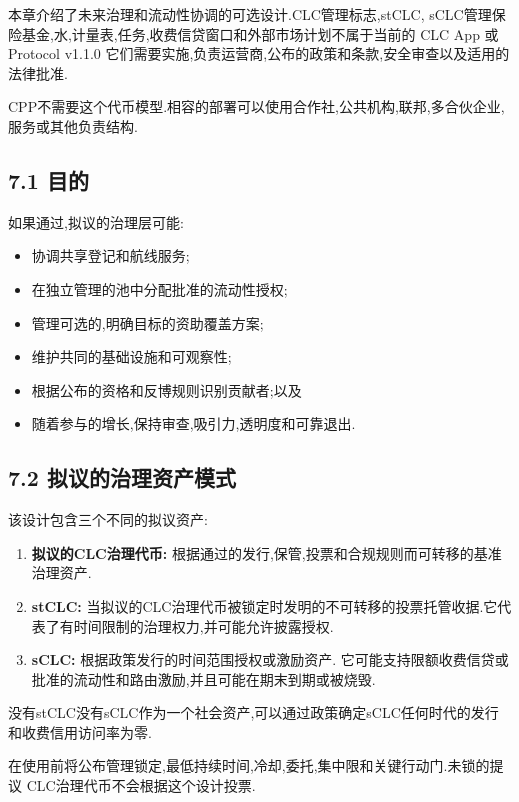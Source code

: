\documentclass[11pt]{article}
\begin{document}
本章介绍了未来治理和流动性协调的可选设计.CLC管理标志,stCLC, sCLC管理保险基金,水,计量表,任务,收费信贷窗口和外部市场计划不属于当前的 CLC App 或 Protocol v1.1.0 它们需要实施,负责运营商,公布的政策和条款,安全审查以及适用的法律批准.

CPP不需要这个代币模型.相容的部署可以使用合作社,公共机构,联邦,多合伙企业,服务或其他负责结构.

\subsection*{7.1 目的}

如果通过,拟议的治理层可能:

\begin{itemize}[leftmargin=*]
\item 协调共享登记和航线服务;
\item 在独立管理的池中分配批准的流动性授权;
\item 管理可选的,明确目标的资助覆盖方案;
\item 维护共同的基础设施和可观察性;
\item 根据公布的资格和反博规则识别贡献者;以及
\item 随着参与的增长,保持审查,吸引力,透明度和可靠退出.
\end{itemize}
\subsection*{7.2 拟议的治理资产模式}

该设计包含三个不同的拟议资产:

\begin{enumerate}[leftmargin=*]
\item \textbf{拟议的CLC治理代币:} 根据通过的发行,保管,投票和合规规则而可转移的基准治理资产.
\item \textbf{stCLC:} 当拟议的CLC治理代币被锁定时发明的不可转移的投票托管收据.它代表了有时间限制的治理权力,并可能允许披露授权.
\item \textbf{sCLC:} 根据政策发行的时间范围授权或激励资产. 它可能支持限额收费信贷或批准的流动性和路由激励,并且可能在期末到期或被烧毁.
\end{enumerate}
没有stCLC没有sCLC作为一个社会资产,可以通过政策确定sCLC任何时代的发行和收费信用访问率为零.

在使用前将公布管理锁定,最低持续时间,冷却,委托,集中限和关键行动门.未锁的提议 CLC治理代币不会根据这个设计投票.
\end{document}
